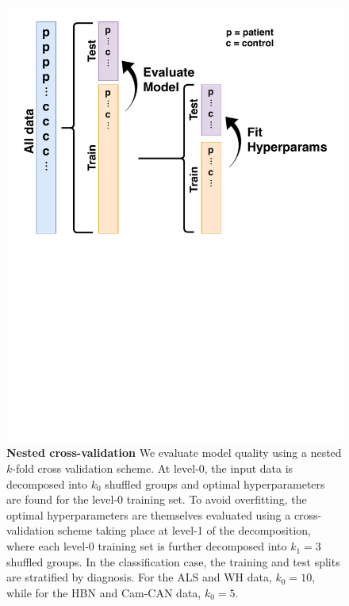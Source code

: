 \documentclass[10pt,%
               aps,%
               prl,%
               reprint,%
               superscriptaddress,%
               preprintnumbers,%
               linenumbers,%
               amsmath,%
               floatfix]{revtex4-2}
\begin{document}
\begin{figure}[t]
    \includegraphics[width=\columnwidth]{nested-cross-validation.pdf}
    \caption{{\bf Nested cross-validation}
        \label{fig:nested-cross-val}
        We evaluate model quality using a nested $k$-fold cross validation
        scheme. At level-0, the input data is decomposed into $k_0$ shuffled
        groups and optimal hyperparameters are found for the level-0 training
        set. To avoid overfitting, the optimal hyperparameters are themselves
        evaluated using a cross-validation scheme taking place at level-1 of
        the decomposition, where each level-0 training set is further
        decomposed into $k_1 = 3$ shuffled groups. In the classification
        case, the training and test splits are stratified by diagnosis. For
        the ALS and WH data, $k_0 = 10$, while for the HBN and Cam-CAN data,
        $k_0 = 5$.
    }
\end{figure}
\end{document}
